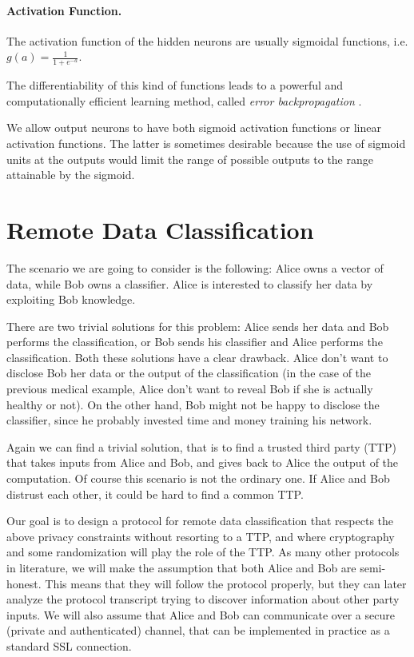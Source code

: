 \documentclass[11pt,oribibl,runningheads]{llncs}
\begin{document}
\paragraph{Activation Function.}
The activation function of the hidden neurons are usually
sigmoidal functions, i.e. $g(a)= \frac{1}{1+e^{-a}}$.

The differentiability of this kind of functions leads to a
powerful and computationally efficient learning method, called
{\em error backpropagation} {\cite{rumelhart1986lir}}.

We allow output neurons to have both sigmoid activation functions or
linear activation functions. The latter is sometimes desirable
because the use of sigmoid units at the outputs would limit the
range of possible outputs to the range attainable by the sigmoid.

\section{Remote Data Classification}
\label{sec:RDC}The scenario we are going to consider is the
following: Alice owns a vector of data, while Bob owns a
classifier. Alice is interested to classify her data by exploiting
Bob knowledge.

There are two trivial solutions for this problem: Alice sends her
data and Bob performs the classification, or Bob sends his
classifier and Alice performs the classification. Both these
solutions have a clear drawback. Alice don't want to
disclose Bob her data or the output of the classification (in
the case of the previous medical example, Alice don't want to
reveal Bob if she is actually healthy or not). On the other
hand, Bob might not be happy to disclose the classifier, since he
probably invested time and money training his
network.

Again we can find a trivial solution, that is to find a trusted
third party (TTP) that takes inputs from Alice and Bob, and gives
 back to Alice the output of the computation. Of course this
scenario is not the ordinary one. If Alice and Bob distrust each
other, it could be hard to find a common TTP.

Our goal is to design a protocol for remote data classification
that respects the above privacy constraints without resorting to a
TTP, and where cryptography and some randomization will play the
role of the TTP. As many other protocols in literature, we will make
the assumption that both Alice and Bob are semi-honest. This means
that they will follow the protocol properly, but they can later
analyze the protocol transcript trying to discover information
about other party inputs.
We will also assume that Alice and Bob
can communicate over a secure (private and authenticated) channel, that can be implemented in practice as a
standard SSL connection.
\end{document}
